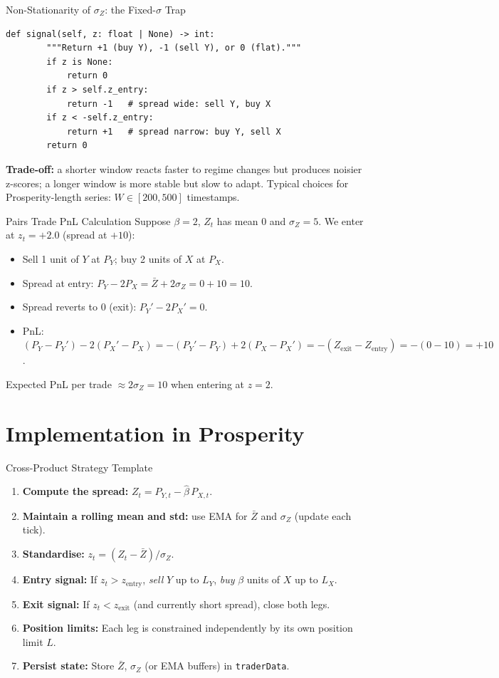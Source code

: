 \documentclass[12pt,a4paper,openany]{report}
\theoremstyle{definition}
\begin{document}
\begin{warningbox}{Non-Stationarity of $\sigma_Z$: the Fixed-$\sigma$ Trap}
\begin{lstlisting}[caption={Rolling z-score for pairs trading}]
    def signal(self, z: float | None) -> int:
        """Return +1 (buy Y), -1 (sell Y), or 0 (flat)."""
        if z is None:
            return 0
        if z > self.z_entry:
            return -1   # spread wide: sell Y, buy X
        if z < -self.z_entry:
            return +1   # spread narrow: buy Y, sell X
        return 0
\end{lstlisting}

\textbf{Trade-off:} a shorter window reacts faster to regime changes but produces noisier z-scores; a longer window is more stable but slow to adapt. Typical choices for Prosperity-length series: $W \in [200, 500]$ timestamps.
\end{warningbox}

\begin{examplebox}{Pairs Trade PnL Calculation}
Suppose $\beta = 2$, $Z_t$ has mean 0 and $\sigma_Z = 5$. We enter at $z_t = +2.0$ (spread at $+10$):
\begin{itemize}
  \item Sell 1 unit of $Y$ at $P_Y$; buy 2 units of $X$ at $P_X$.
  \item Spread at entry: $P_Y - 2P_X = \bar{Z} + 2\sigma_Z = 0 + 10 = 10$.
  \item Spread reverts to 0 (exit): $P_Y' - 2P_X' = 0$.
  \item PnL: $(P_Y - P_Y') - 2(P_X' - P_X) = -(P_Y' - P_Y) + 2(P_X - P_X') = -(Z_{\text{exit}} - Z_{\text{entry}}) = -(0 - 10) = +10$.
\end{itemize}
Expected PnL per trade $\approx 2\sigma_Z = 10$ when entering at $z = 2$.
\end{examplebox}

\section{Implementation in Prosperity}

\begin{keyconceptbox}{Cross-Product Strategy Template}
\begin{enumerate}[label=\arabic*.]
  \item \textbf{Compute the spread:} $Z_t = P_{Y,t} - \hat{\beta}\,P_{X,t}$.
  \item \textbf{Maintain a rolling mean and std:} use EMA for $\bar{Z}$ and $\sigma_Z$ (update each tick).
  \item \textbf{Standardise:} $z_t = (Z_t - \bar{Z}) / \sigma_Z$.
  \item \textbf{Entry signal:} If $z_t > z_{\text{entry}}$, \emph{sell} $Y$ up to $L_Y$, \emph{buy} $\beta$ units of $X$ up to $L_X$.
  \item \textbf{Exit signal:} If $z_t < z_{\text{exit}}$ (and currently short spread), close both legs.
  \item \textbf{Position limits:} Each leg is constrained independently by its own position limit $L$.
  \item \textbf{Persist state:} Store $\bar{Z}$, $\sigma_Z$ (or EMA buffers) in \texttt{traderData}.
\end{enumerate}
\end{keyconceptbox}
\end{document}

